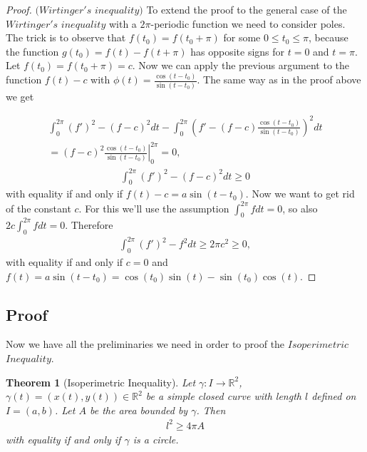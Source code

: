\documentclass[12pt, a4paper, titlepage]{article}
\newtheorem{thm}{Theorem}
\begin{document}
\begin{proof} $(Wirtinger's$ $inequality)$ To extend the proof to the general case of the $Wirtinger's$ $inequality$ with a $2\pi$-periodic function we need to consider poles. The trick is to observe that $f(t_0) = f(t_0+\pi)$ for some $0 \leq t_0 \leq \pi$, because the function $g(t_0) = f(t) - f(t+\pi)$ has opposite signs for $t = 0$ and $t = \pi$. Let $f(t_0) = f(t_0+\pi) = c$. Now we can apply the previous argument to the function $f(t)-c$ with $\phi(t) = \frac{\cos(t-t_0)}{\sin(t-t_0)}$. The same way as in the proof above we get

\begin{align*}
\int_{0}^{2\pi}(f')^2-(f-c)^2dt - \int_{0}^{2\pi}\left(f'-(f-c)\frac{\cos(t-t_0)}{\sin(t-t_0)}\right)^2dt \\
= \left.(f-c)^2\frac{\cos (t-t_0)}{\sin (t-t_0)}\right|^{2\pi}_0 = 0,
\end{align*}
\begin{align*}
\int_{0}^{2\pi}(f')^2-(f-c)^2dt \geq 0
\end{align*}
with equality if and only if $f(t) - c = a\sin(t-t_0).$
Now we want to get rid of the constant $c$. For this we'll use the assumption $\int_{0}^{2\pi}fdt = 0$, so also $2c\int_{0}^{2\pi}fdt=0$. Therefore
\begin{align*}
\int_{0}^{2\pi}(f')^2-f^2dt\geq 2\pi c^2 \geq 0,
\end{align*}
with equality if and only if $c=0$ and $f(t)=a\sin(t-t_0) = \cos(t_0)\sin(t)-\sin(t_0)\cos(t)$.
\end{proof}


\subsection{Proof}
Now we have all the preliminaries we need in order to proof the $Isoperimetric$ $Inequality$.

\begin{thm}[Isoperimetric Inequality] Let $\gamma: I \rightarrow \mathbb{R}^2$, $\gamma(t) = (x(t),y(t)) \in \mathbb{R}^2$ be a simple closed curve with length $l$ defined on $I=(a,b)$. Let $A$ be the area bounded by $\gamma$. Then
\begin{align*}
l^2 \geq 4\pi A
\end{align*}
with equality if and only if $\gamma$ is a circle.
\end{thm}
\end{document}
